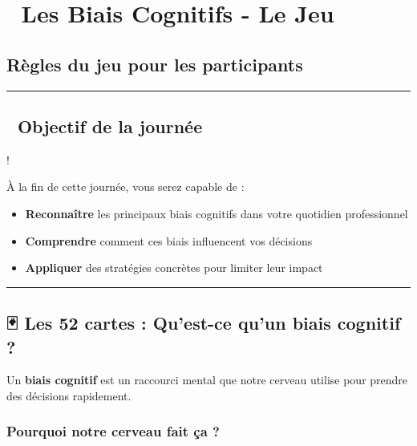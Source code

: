 \documentclass[
]{article}
\author{}
\date{\vspace{-2.5em}}
\providecommand{\tightlist}{%
  \setlength{\itemsep}{0pt}\setlength{\parskip}{0pt}}
\begin{document}
\section{🧠 Les Biais Cognitifs - Le
Jeu}\label{les-biais-cognitifs---le-jeu}

\subsection{Règles du jeu pour les
participants}\label{ruxe8gles-du-jeu-pour-les-participants}

\begin{center}\rule{0.5\linewidth}{0.5pt}\end{center}

\subsection{🎯 Objectif de la journée}\label{objectif-de-la-journuxe9e}

!

À la fin de cette journée, vous serez capable de :

\begin{itemize}
\tightlist
\item
  \textbf{Reconnaître} les principaux biais cognitifs dans votre
  quotidien professionnel
\item
  \textbf{Comprendre} comment ces biais influencent vos décisions
\item
  \textbf{Appliquer} des stratégies concrètes pour limiter leur impact
\end{itemize}

\begin{center}\rule{0.5\linewidth}{0.5pt}\end{center}

\subsection{🃏 Les 52 cartes : Qu'est-ce qu'un biais cognitif
?}\label{les-52-cartes-quest-ce-quun-biais-cognitif}

Un \textbf{biais cognitif} est un raccourci mental que notre cerveau
utilise pour prendre des décisions rapidement.

\subsubsection{Pourquoi notre cerveau fait ça
?}\label{pourquoi-notre-cerveau-fait-uxe7a}
\end{document}
